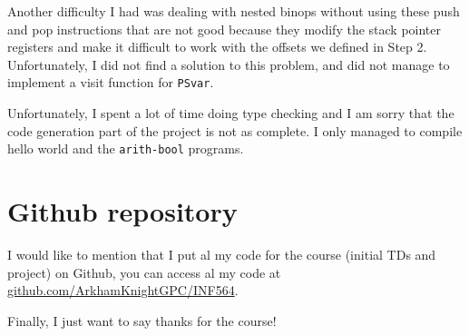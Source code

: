 \documentclass[a4paper,12pt,twoside]{article}
\begin{document}
	Another difficulty I had was dealing with nested binops without using these push and pop instructions that are not good because they modify the stack pointer registers and make it difficult to work with the offsets we defined in Step 2.
	Unfortunately, I did not find a solution to this problem, and did not manage to implement a visit function for \texttt{PSvar}.
	
	Unfortunately, I spent a lot of time doing type checking and I am sorry that the code generation part of the project is not as complete. I only managed to compile hello world and the \texttt{arith-bool} programs.
	
	\section{Github repository}
	
	I would like to mention that I put al my code for the course (initial TDs and project) on Github, you can access al my code at \href{https://github.com/ArkhamKnightGPC/INF564}{github.com/ArkhamKnightGPC/INF564}.
	
	Finally, I just want to say thanks for the course!
	
	
\end{document}
